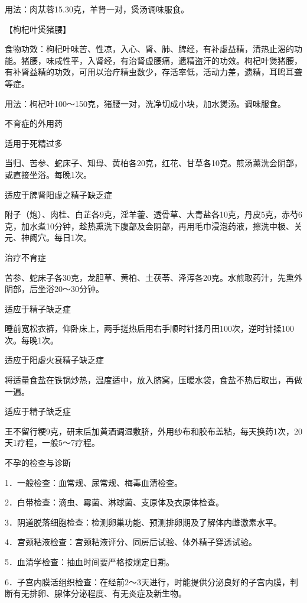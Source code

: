 \documentclass[12pt,UTF8]{ctexbook}
\begin{document}
用法：肉苁蓉15.30克，羊肾一对，煲汤调味服食。

【枸杞叶煲猪腰】

食物功效：枸杞叶味苦、性凉，入心、肾、肺、脾经，有补虚益精，清热止渴的功能。猪腰，味咸性平，入肾经，有治肾虚腰痛，遗精盗汗的功效。枸杞叶煲猪腰，有补肾益精的功效，可用以治疗精虫数少，存活率低，活动力差，遗精，耳鸣耳聋等症。

用法：枸杞叶100～150克，猪腰一对，洗净切成小块，加水煲汤。调味服食。





不育症的外用药


适用于死精过多

当归、苦参、蛇床子、知母、黄柏各20克，红花、甘草各10克。煎汤薰洗会阴部，或直接坐浴。每晚1次。

适应于脾肾阳虚之精子缺乏症

附子（炮）、肉桂、白芷各9克，淫羊藿、透骨草、大青盐各10克，丹皮5克，赤芍6克，加水煮10分钟，趁热熏洗下腹部及会阴部，再用毛巾浸泡药液，擦洗中极、关元、神阙穴。每日1次。

治疗不育症

苦参、蛇床子各30克，龙胆草、黄柏、土茯苓、泽泻各20克。水煎取药汁，先熏外阴部，后坐浴20～30分钟。

适应于精子缺乏症

睡前宽松衣裤，仰卧床上，两手搓热后用右手顺时针揉丹田100次，逆时针揉100次。每晚1次。

适应于阳虚火衰精子缺乏症

将适量食盐在铁锅炒热，温度适中，放入脐窝，压暖水袋，食盐不热后取出，再做一遍。

适应于精子缺乏症

王不留行粳9克，研末后加黄酒调湿敷脐，外用纱布和胶布盖粘，每天换药1次，20天1疗程，一般5～7疗程。





不孕的检查与诊断


1．一般检查：血常规、尿常规、梅毒血清检查。

2．白带检查：滴虫、霉菌、淋球菌、支原体及衣原体检查。

3．阴道脱落细胞检查：检测卵巢功能、预测排卵期及了解体内雌激素水平。

4．宫颈粘液检查：宫颈粘液评分、同房后试验、体外精子穿透试验。

5．血清学检查：抽血时间要严格按规定日期。

6．子宫内膜活组织检查：在经前2～3天进行，时能提供分泌良好的子宫内膜，判断有无排卵、腺体分泌程度、有无炎症及新生物。
\end{document}
